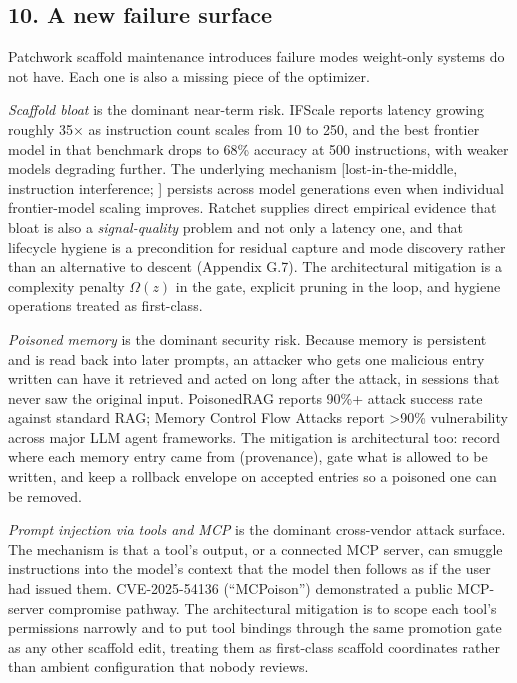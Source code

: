 \subsection{10. A new failure surface}\label{a-new-failure-surface}

Patchwork scaffold maintenance introduces failure modes weight-only
systems do not have. Each one is also a missing piece of the optimizer.

\emph{Scaffold bloat} is the dominant near-term risk. IFScale
\citep{jaroslawicz2025ifscale} reports latency growing roughly 35× as
instruction count scales from 10 to 250, and the best frontier model in
that benchmark drops to 68\% accuracy at 500 instructions, with weaker
models degrading further. The underlying mechanism {[}lost-in-the-middle,
instruction interference; \citet{liu2023lostmiddle}{]} persists across
model generations even when individual frontier-model scaling improves.
Ratchet \citep{zhang2026ratchet} supplies direct empirical evidence that
bloat is also a \emph{signal-quality} problem and not only a latency one,
and that lifecycle hygiene is a precondition for residual capture and
mode discovery rather than an alternative to descent (Appendix G.7). The
architectural mitigation is a complexity penalty \(\Omega(z)\) in the
gate, explicit pruning in the loop, and hygiene operations treated as
first-class.

\emph{Poisoned memory} is the dominant security risk. Because memory is
persistent and is read back into later prompts, an attacker who gets one
malicious entry written can have it retrieved and acted on long after
the attack, in sessions that never saw the original input. PoisonedRAG
reports 90\%+ attack success rate against standard RAG; Memory Control
Flow Attacks report \textgreater90\% vulnerability across major LLM
agent frameworks. The mitigation is architectural too: record where each
memory entry came from (provenance), gate what is allowed to be written,
and keep a rollback envelope on accepted entries so a poisoned one can
be removed.

\emph{Prompt injection via tools and MCP} is the dominant cross-vendor
attack surface. The mechanism is that a tool's output, or a connected
MCP server, can smuggle instructions into the model's context that the
model then follows as if the user had issued them. CVE-2025-54136
(``MCPoison'') demonstrated a public MCP-server compromise pathway. The
architectural mitigation is to scope each tool's permissions narrowly
and to put tool bindings through the same promotion gate as any other
scaffold edit, treating them as first-class scaffold coordinates rather
than ambient configuration that nobody reviews.

